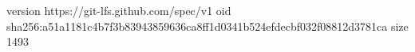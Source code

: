 version https://git-lfs.github.com/spec/v1
oid sha256:a51a1181c4b7f3b83943859636ca8ff1d0341b524efdecbf032f08812d3781ca
size 1493
